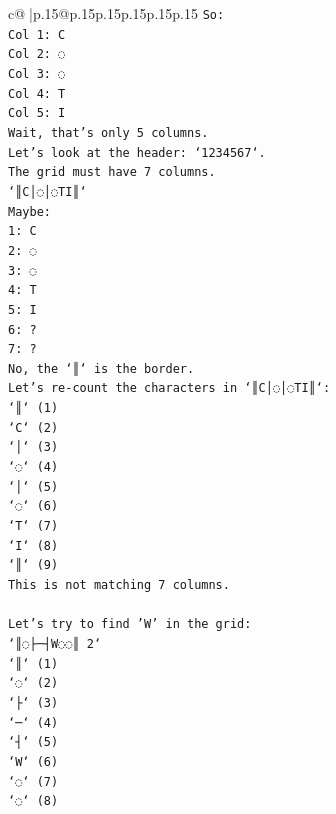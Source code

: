 \documentclass{article}
\begin{document}
{\begin{supertabular}{c@{$\;$}|p{.15\linewidth}@{}p{.15\linewidth}p{.15\linewidth}p{.15\linewidth}p{.15\linewidth}p{.15\linewidth}}
{{{\texttt{So:} \\
\texttt{Col 1: C} \\
\texttt{Col 2: ◌} \\
\texttt{Col 3: ◌} \\
\texttt{Col 4: T} \\
\texttt{Col 5: I} \\
\texttt{Wait, that's only 5 columns.} \\
\texttt{Let's look at the header: `1234567`.} \\
\texttt{The grid must have 7 columns.} \\
\texttt{`║C│◌│◌TI║`} \\
\texttt{Maybe:} \\
\texttt{1: C} \\
\texttt{2: ◌} \\
\texttt{3: ◌} \\
\texttt{4: T} \\
\texttt{5: I} \\
\texttt{6: ?} \\
\texttt{7: ?} \\
\texttt{No, the `║` is the border.} \\
\texttt{Let's re{-}count the characters in `║C│◌│◌TI║`:} \\
\texttt{`║` (1)} \\
\texttt{`C` (2)} \\
\texttt{`│` (3)} \\
\texttt{`◌` (4)} \\
\texttt{`│` (5)} \\
\texttt{`◌` (6)} \\
\texttt{`T` (7)} \\
\texttt{`I` (8)} \\
\texttt{`║` (9)} \\
\texttt{This is not matching 7 columns.} \\
\\ 
\texttt{Let's try to find 'W' in the grid:} \\
\texttt{`║◌├─┤W◌◌║ 2`} \\
\texttt{`║` (1)} \\
\texttt{`◌` (2)} \\
\texttt{`├` (3)} \\
\texttt{`─` (4)} \\
\texttt{`┤` (5)} \\
\texttt{`W` (6)} \\
\texttt{`◌` (7)} \\
\texttt{`◌` (8)} \\
}}}
\end{supertabular}}
\end{document}
